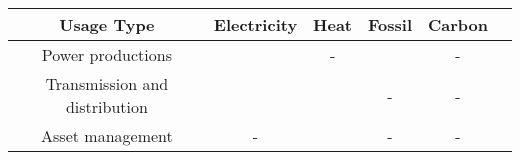 \begin{table}[htbp!]
    \centering
    \begin{tabular}{c|c|c|c|c|c}
 \hline
  
 \textbf{Usage Type}  
 &   \textbf{Electricity}   
 &   \textbf{Heat} 
 &   \textbf{Fossil}
 &   \textbf{Carbon} \\
    \hline 
    \hline
      Power productions  
      & %
      \cite{Zhou2016BigInsights, Yan2019Data-drivenSearch, Wang2020ASources, Singhal2019AResources, Bukhsh2018TowardsGrid, Wu2019OptimalApproach}
      & %
      -
      & %
      \cite{Nashawi2010ForecastingModel}
      & %
      -
 \\  \hline 
      Transmission and distribution   
      & %
      \cite{Ma2018ForecastingAssumptions, Wang2020ASources}
      & %
      \cite{Guo2019Data-basedStudies}
      & %
      -
      & %
      -
\\     \hline 
      Asset management  
     & %
      -
      & %
      \cite{Zhou2016BigInsights, Godwin2013ClassificationAnalysis}
      & %
      -
      & %
      -
      

\end{tabular}
\end{table}
